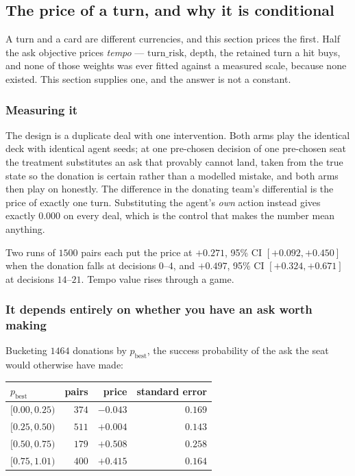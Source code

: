 \documentclass[11pt,letterpaper]{article}
\begin{document}
\subsection{The price of a turn, and why it is conditional}
\label{sec:tempo}

A turn and a card are different currencies, and this section prices the
first. Half the ask objective
prices \emph{tempo} --- $\mathrm{turn\_risk}$, depth, the retained turn a hit
buys, and none of those weights was ever fitted against a measured scale,
because none existed. This section supplies one, and the answer is not a
constant.

\subsubsection{Measuring it}

The design is a duplicate deal with one intervention. Both arms play the
identical deck with identical agent seeds; at one pre-chosen decision of one
pre-chosen seat the treatment substitutes an ask that provably cannot land,
taken from the true state so the donation is certain rather than a modelled
mistake, and both arms then play on honestly. The difference in the donating
team's differential is the price of exactly one turn. Substituting the agent's
\emph{own} action instead gives exactly $0.000$ on every deal, which is the
control that makes the number mean anything.

Two runs of $1500$ pairs each put the price at $+0.271$, 95\% CI
$[+0.092, +0.450]$ when the donation falls at decisions $0$--$4$, and $+0.497$,
95\% CI $[+0.324, +0.671]$ at decisions $14$--$21$. Tempo value rises through a
game.

\subsubsection{It depends entirely on whether you have an ask worth making}

Bucketing $1464$ donations by $p_{\text{best}}$, the success probability of the
ask the seat would otherwise have made:

\begin{center}
\begin{tabular}{lrrr}
\toprule
$p_{\text{best}}$ & pairs & price & standard error \\
\midrule
$[0.00, 0.25)$ & $374$ & $-0.043$ & $0.169$ \\
$[0.25, 0.50)$ & $511$ & $+0.004$ & $0.143$ \\
$[0.50, 0.75)$ & $179$ & $\mathbf{+0.508}$ & $0.258$ \\
$[0.75, 1.01)$ & $400$ & $\mathbf{+0.415}$ & $0.164$ \\
\bottomrule
\end{tabular}
\end{center}
\end{document}
